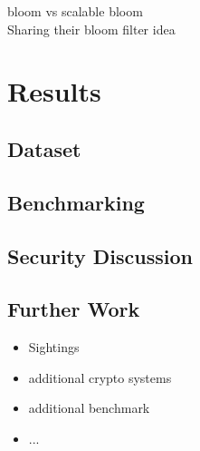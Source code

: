 \documentclass{eplmastersthesis}
\begin{document}
bloom vs scalable bloom \\

Sharing their bloom filter idea \\

\chapter{Results}

\section{Dataset}

\section{Benchmarking}

\section{Security Discussion}

\section{Further Work}
\begin{itemize}
\item Sightings
\item additional crypto systems
\item additional benchmark
\item ...
\end{itemize}


\newpage


\newpage

\backcoverpage
\end{document}

